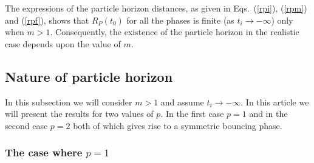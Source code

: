\documentclass[24pt]{article}
\begin{document}
The expressions of the particle horizon distances, as given in
Eqs.~(\ref{rpi}), (\ref{rpm}) and (\ref{rpf}), shows that $R_P(t_0)$
for all the phases is finite (as $t_i \to -\infty$) only when
$m>1$. Consequently, the existence of the particle horizon in the
realistic case depends upon the value of $m$.
\subsection{Nature of particle horizon}

In this subsection we will consider $m>1$ and assume $t_i \to -\infty$.
In this article we will present the results for two values of
$p$. In the first case $p=1$ and in the second case $p=2$ both of
which gives rise to a symmetric bouncing phase.
\subsubsection{The case where $p=1$}
\end{document}
